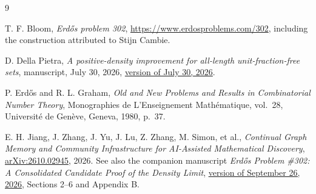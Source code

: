 \documentclass[11pt]{amsart}
\theoremstyle{definition}
\theoremstyle{remark}
\numberwithin{equation}{section}
\begin{document}
\begin{thebibliography}{9}

T. F. Bloom,
\emph{Erd\H{o}s problem 302},
\url{https://www.erdosproblems.com/302},
including the construction attributed to Stijn Cambie.

D. Della Pietra,
\emph{A positive-density improvement for all-length unit-fraction-free sets},
manuscript, July 30, 2026,
\href{https://github.com/donalddellapietra/erdos-301-proof/blob/789c6f045dbc81da3811031247d186a7128dafce/paper/main.tex}{version of July 30, 2026}.

P. Erd\H{o}s and R. L. Graham,
\emph{Old and New Problems and Results in Combinatorial Number Theory},
Monographies de L'Enseignement Math\'ematique, vol.~28,
Universit\'e de Gen\`eve, Geneva, 1980, p.~37.

E. H. Jiang, J. Zhang, J. Yu, J. Lu, Z. Zhang, M. Simon, et al.,
\emph{Continual Graph Memory and Community Infrastructure for AI-Assisted Mathematical Discovery},
\href{https://arxiv.org/abs/2610.02945}{arXiv:2610.02945}, 2026.
See also the companion manuscript
\emph{Erd\H{o}s Problem \#302: A Consolidated Candidate Proof of the Density Limit},
\href{https://github.com/uclanlp/continual-graph-memory/blob/23367c6568c344d9c4dbf59be3f39b39f5d54324/results/erdos_302.md}{version of September 26, 2026},
Sections 2--6 and Appendix B.

\end{thebibliography}
\end{document}
